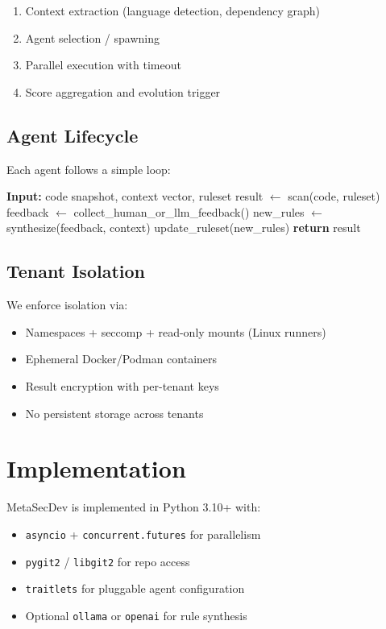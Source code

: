 \documentclass[10pt,a4paper]{article}
\begin{document}
\begin{enumerate}
    \item Context extraction (language detection, dependency graph)
    \item Agent selection / spawning
    \item Parallel execution with timeout
    \item Score aggregation and evolution trigger
\end{enumerate}

\subsection{Agent Lifecycle}

Each agent follows a simple loop:

\begin{algorithm}
\caption{Simplified Agent Execution Loop}
\begin{algorithmic}[1]
\State \textbf{Input:} code snapshot, context vector, ruleset
\State result $\gets$ scan(code, ruleset)
    \State feedback $\gets$ collect_human_or_llm_feedback()
    \State new\_rules $\gets$ synthesize(feedback, context)
    \State update\_ruleset(new\_rules)
\EndIf
\State \textbf{return} result
\end{algorithmic}
\end{algorithm}

\subsection{Tenant Isolation}

We enforce isolation via:
\begin{itemize}
    \item Namespaces + seccomp + read-only mounts (Linux runners)
    \item Ephemeral Docker/Podman containers
    \item Result encryption with per-tenant keys
    \item No persistent storage across tenants
\end{itemize}

\section{Implementation}

MetaSecDev is implemented in Python 3.10+ with:

\begin{itemize}
    \item \texttt{asyncio} + \texttt{concurrent.futures} for parallelism
    \item \texttt{pygit2} / \texttt{libgit2} for repo access
    \item \texttt{traitlets} for pluggable agent configuration
    \item Optional \texttt{ollama} or \texttt{openai} for rule synthesis
\end{itemize}
\end{document}
